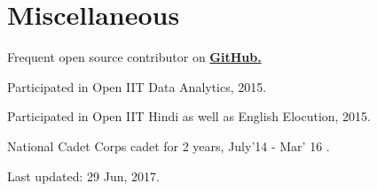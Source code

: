 \documentclass[a4paper, 10pt]{deedy-resume} %
\begin{document}
\begin{minipage}[t]{0.66\textwidth}
  \section{Miscellaneous}
  \vspace{\topsep}
  \begin{tightitemize}
  \item Frequent open source contributor on \href{https://github.com/kaustubhhiware}{\bf GitHub.}
  \item Participated in Open IIT Data Analytics, 2015.
  \item Participated in Open IIT Hindi as well as English Elocution, 2015.
  \item National Cadet Corps cadet for 2 years, July'14 - Mar' 16 .\linebreak
  \end{tightitemize}

\end{minipage}
	
	\begin{flushright}
	\footnotesize Last updated: 29 Jun, 2017.
	\end{flushright}
\end{document}
